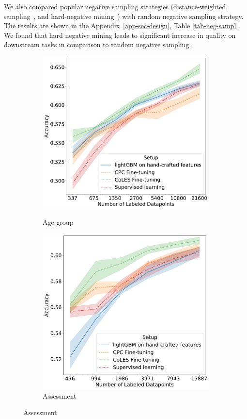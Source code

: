\documentclass{article}
\begin{document}
We also compared popular negative sampling strategies (distance-weighted sampling~\citep{Manmatha2017SamplingMI}, and hard-negative mining~\citep{Schroff2015FaceNetAU}) with random negative sampling strategy. The results are shown in the Appendix~\ref{app-sec-design}, Table \ref{tab-neg-sampl}. We found that hard negative mining leads to significant increase in quality on downstream tasks in comparison to random negative sampling.

\begin{figure}
  \centering
  \begin{subfigure}[t]{0.49\linewidth}
    \caption{Age group}
    \includegraphics[width=\linewidth]{figures/ss_age_pred.pdf}
    \label{fig-semi-age}
  \end{subfigure}
  \hfill%
  \begin{subfigure}[t]{0.49\linewidth}
    \caption{Assessment}
    \includegraphics[width=\linewidth]{figures/ss_bowl2019.pdf}

\end{subfigure}
\end{figure}
\end{document}
